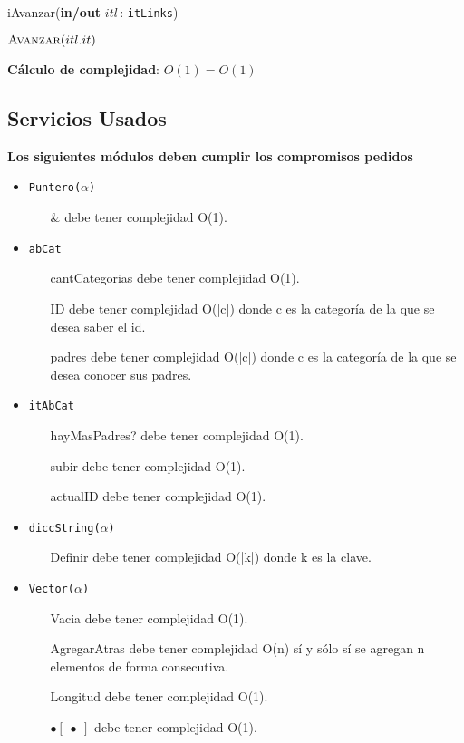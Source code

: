 \documentclass[10pt, a4paper]{article}
\let\TipoVariable=\texttt
\let\ModificadorArgumento=\textbf
\newcommand{\Inout}[2]{\ModificadorArgumento{in/out} \ensuremath{#1}\,: \TipoVariable{#2}\xspace}
\begin{document}
\begin{algorithm}[H]
\caption*{iAvanzar(\Inout{itl}{itLinks})}
\begin{algorithmic}[1]
	\State $\Call{Avanzar}{itl.it}$
\end{algorithmic}
\textbf{C\'alculo de complejidad}: $O(1) = O(1)$
\end{algorithm}

\subsection{Servicios Usados}

\textbf{Los siguientes m\'odulos deben cumplir los compromisos pedidos}

\begin{itemize}
	\item \TipoVariable{Puntero($\alpha$)}
	\begin{itemize}
		\item[\&] debe tener complejidad O(1).
	\end{itemize}

	\item \TipoVariable{abCat}
	\begin{itemize}
		\item[cantCategorias] debe tener complejidad O(1).
		\item[ID] debe tener complejidad O(|c|) donde c es la categor\'ia de la que se desea saber el id.
		\item[padres] debe tener complejidad O(|c|) donde c es la categor\'ia de la que se desea conocer sus padres.
	\end{itemize}

	\item \TipoVariable{itAbCat}
	\begin{itemize}
		\item[hayMasPadres?] debe tener complejidad O(1).
		\item[subir] debe tener complejidad O(1).
		\item[actualID] debe tener complejidad O(1).
	\end{itemize}

	\item \TipoVariable{diccString($\alpha$)}
	\begin{itemize}
		\item[Definir] debe tener complejidad O(|k|) donde k es la clave.
	\end{itemize}

	\item \TipoVariable{Vector($\alpha$)}
	\begin{itemize}
		\item[Vacia] debe tener complejidad O(1).
		\item[AgregarAtras] debe tener complejidad O(n) s\'i y s\'olo s\'i se agregan n elementos de forma consecutiva.
		\item[Longitud] debe tener complejidad O(1).
		\item[$\bullet\begin{bmatrix}\bullet\end{bmatrix}$] debe tener complejidad O(1).
	\end{itemize}


\end{itemize}
\end{document}
